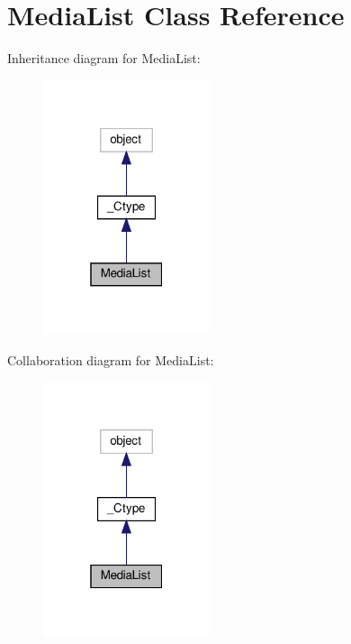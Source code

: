 \hypertarget{classvlc_1_1_media_list}{}\section{Media\+List Class Reference}
\label{classvlc_1_1_media_list}


Inheritance diagram for Media\+List\+:
\nopagebreak
\begin{figure}[H]
\begin{center}
\leavevmode
\includegraphics[width=139pt]{classvlc_1_1_media_list__inherit__graph}
\end{center}
\end{figure}


Collaboration diagram for Media\+List\+:
\nopagebreak
\begin{figure}[H]
\begin{center}
\leavevmode
\includegraphics[width=139pt]{classvlc_1_1_media_list__coll__graph}
\end{center}
\end{figure}
